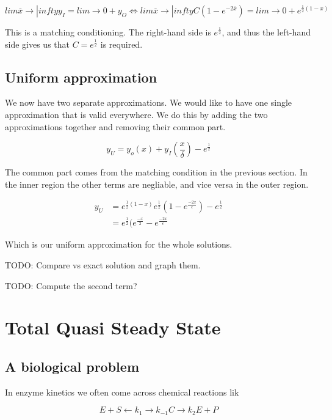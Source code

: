 \documentclass[12pt]{article}
\begin{document}
\begin{equation}
lim \overline{x} \to |infty y_I = lim \to 0+ y_O \iff
lim \overline{x} \to |infty C(1 - e^{-2\overline{x}}) = lim \to 0+
e^{\frac{1}{2}(1-x)}
\end{equation}

This is a matching conditioning. The right-hand side is $e^{\frac{1}{2}}$, and
thus the left-hand side gives us that $C = e^{\frac{1}{2}}$ is required.

\subsection{Uniform approximation}

We now have two separate approximations. We would like to have one single
approximation that is valid everywhere. We do this by adding the two
approximations together and removing their common part.

\begin{equation}
y_U = y_o(x) + y_I(\frac{x}{\delta}) - e^{\frac{1}{2}}
\end{equation}

The common part comes from the matching condition in the previous section. In
the inner region the other terms are negliable, and vice versa in the outer
region.

\begin{align}
y_U &= e^{\frac{1}{2}(1-x)} e^{\frac{1}{2}}(1 - e^{\frac{-2x}{\epsilon}}) -
e^{\frac{1}{2}} \\
    &=  e^{\frac{1}{2}}(e^{\frac{-x}{2}} - e^{\frac{-2x}{\epsilon}}
\end{align}

Which is our uniform approximation for the whole solutions.

TODO: Compare vs exact solution and graph them.

TODO: Compute the second term?

\section{Total Quasi Steady State}

\subsection{A biological problem}

In enzyme kinetics we often come across chemical reactions lik

\begin{equation}
E + S \leftarrow k_1 \rightarrow k_{-1} C \rightarrow k_2 E + P
\end{equation}
\end{document}
